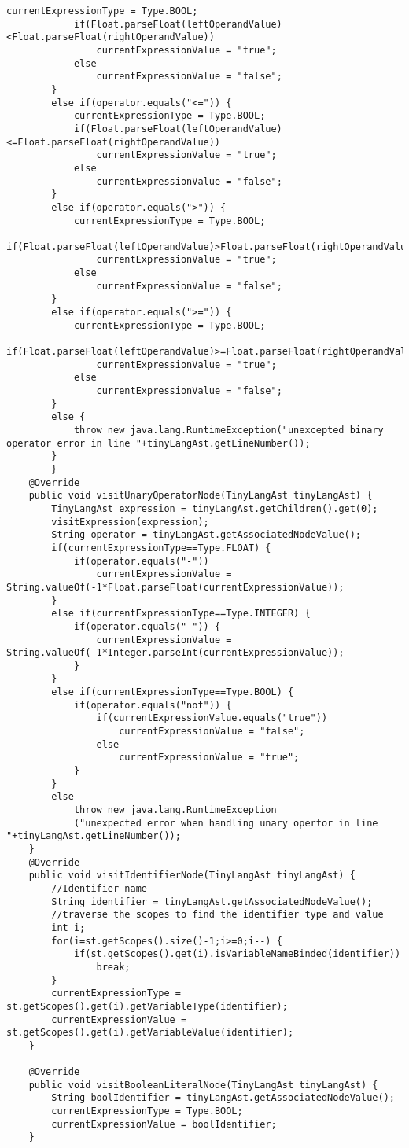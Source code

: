 \begin{lstlisting}[basicstyle=\miniscule,caption=Interpreter,label=listing:interpreter]
			currentExpressionType = Type.BOOL;
			if(Float.parseFloat(leftOperandValue)<Float.parseFloat(rightOperandValue))
				currentExpressionValue = "true";
			else 
				currentExpressionValue = "false";
		}
		else if(operator.equals("<=")) {
			currentExpressionType = Type.BOOL;
			if(Float.parseFloat(leftOperandValue)<=Float.parseFloat(rightOperandValue))
				currentExpressionValue = "true";
			else 
				currentExpressionValue = "false";
		}
		else if(operator.equals(">")) {
			currentExpressionType = Type.BOOL;
			if(Float.parseFloat(leftOperandValue)>Float.parseFloat(rightOperandValue))
				currentExpressionValue = "true";
			else 
				currentExpressionValue = "false";
		}
		else if(operator.equals(">=")) {
			currentExpressionType = Type.BOOL;
			if(Float.parseFloat(leftOperandValue)>=Float.parseFloat(rightOperandValue))
				currentExpressionValue = "true";
			else 
				currentExpressionValue = "false";
		}
		else {
			throw new java.lang.RuntimeException("unexcepted binary operator error in line "+tinyLangAst.getLineNumber());
		}
		}
	@Override
	public void visitUnaryOperatorNode(TinyLangAst tinyLangAst) {
		TinyLangAst expression = tinyLangAst.getChildren().get(0);
		visitExpression(expression);
		String operator = tinyLangAst.getAssociatedNodeValue();
		if(currentExpressionType==Type.FLOAT) {
			if(operator.equals("-"))
				currentExpressionValue = String.valueOf(-1*Float.parseFloat(currentExpressionValue));
		}
		else if(currentExpressionType==Type.INTEGER) {
			if(operator.equals("-")) {
				currentExpressionValue = String.valueOf(-1*Integer.parseInt(currentExpressionValue));
			}
		}
		else if(currentExpressionType==Type.BOOL) {
			if(operator.equals("not")) {
				if(currentExpressionValue.equals("true"))
					currentExpressionValue = "false";
				else 
					currentExpressionValue = "true";		
			}
		}
		else
			throw new java.lang.RuntimeException
			("unexpected error when handling unary opertor in line "+tinyLangAst.getLineNumber());
	}
	@Override
	public void visitIdentifierNode(TinyLangAst tinyLangAst) {
		//Identifier name
		String identifier = tinyLangAst.getAssociatedNodeValue();
		//traverse the scopes to find the identifier type and value
		int i;
		for(i=st.getScopes().size()-1;i>=0;i--) {
			if(st.getScopes().get(i).isVariableNameBinded(identifier))
				break;
		}
		currentExpressionType = st.getScopes().get(i).getVariableType(identifier);
		currentExpressionValue = st.getScopes().get(i).getVariableValue(identifier);
	}

	@Override
	public void visitBooleanLiteralNode(TinyLangAst tinyLangAst) {
		String boolIdentifier = tinyLangAst.getAssociatedNodeValue();
		currentExpressionType = Type.BOOL;
		currentExpressionValue = boolIdentifier;
	}


\end{lstlisting}
